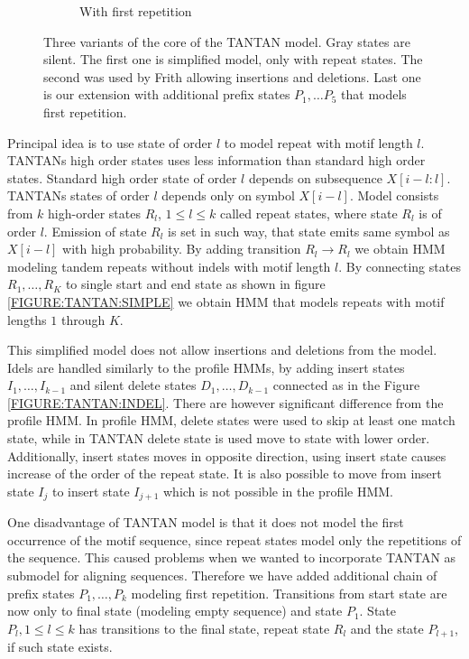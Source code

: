 \begin{figure}
\begin{center}
\begin{subfigure}{0.35\textwidth}
\caption{With first repetition}\label{FIGURE:TANTAN:INIT}
\end{subfigure}%
\end{center}
\caption{Three variants of the core of the TANTAN model. Gray states are
silent. The first one is simplified model, only with repeat states. The second
was used by Frith \cite{Frith2011} allowing insertions and deletions.  Last one
is our extension with additional prefix states $P_1, \dots P_5$ that models
first repetition.}\label{FIGURE:TANTAN}
\end{figure}

Principal idea is to use state of order $l$ to model repeat with motif length
$l$. TANTANs high order states uses less information than standard high order
states.  Standard high order state of order $l$ depends on subsequence
$X[i-l:l]$. TANTANs states of order $l$ depends only on symbol $X[i-l]$. Model
consists from $k$ high-order states $R_l$, $1\leq l\leq k$ called repeat
states, where state $R_l$ is of order $l$. Emission of state $R_l$ is set in
such way, that state emits same symbol as $X[i-l]$ with high probability. By
adding transition $R_l\to R_l$ we obtain HMM modeling tandem repeats without
indels with motif length $l$. By connecting states $R_1,\dots, R_K$ to single
start and end state as shown in figure \ref{FIGURE:TANTAN:SIMPLE} we obtain HMM
that models repeats with motif lengths $1$ through $K$.

This simplified model does not allow insertions and deletions from the model.
Idels are handled similarly to the profile HMMs, by adding insert states
$I_1,\dots, I_{k-1}$ and silent delete states $D_1, \dots, D_{k-1}$ connected
as in the Figure \ref{FIGURE:TANTAN:INDEL}. There are however significant 
difference from the profile HMM.  In profile HMM, delete states were used to
skip at least one match state, while in TANTAN delete state is used move to
state with lower order. Additionally, insert states moves in opposite
direction, using insert state causes increase of the order of the repeat state.
It is also possible to move from insert state $I_{j}$ to insert state $I_{j+1}$
which is not possible in the profile HMM.

One disadvantage of TANTAN model is that it does not model the first occurrence
of the motif sequence, since repeat states model only the repetitions of
the sequence. This caused problems when we wanted to incorporate TANTAN as submodel
for aligning sequences. Therefore we have added additional chain of prefix states $P_1,\dots, P_k$
modeling first repetition. Transitions from start state are now only to final state (modeling
empty sequence) and state $P_1$. State $P_l, 1\leq l\leq k$ has transitions to the final state,
repeat state $R_l$ and the state $P_{l+1}$, if such state exists.

